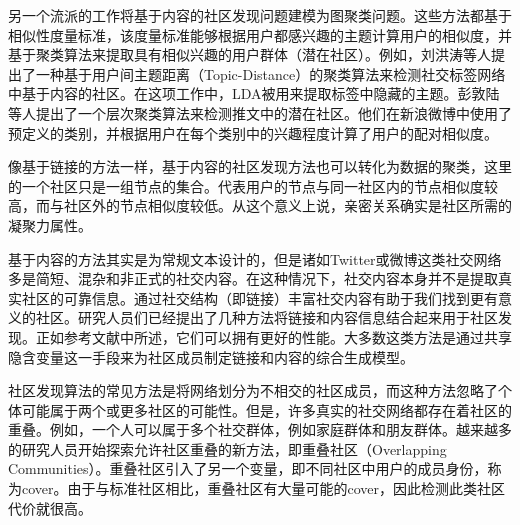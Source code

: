 另一个流派的工作将基于内容的社区发现问题建模为图聚类问题。这些方法都基于相似性度量标准，该度量标准能够根据用户都感兴趣的主题计算用户的相似度，并基于聚类算法来提取具有相似兴趣的用户群体（潜在社区）。例如，刘洪涛等人\cite{Liu2014Community}提出了一种基于用户间主题距离（Topic-Distance）的聚类算法来检测社交标签网络中基于内容的社区。在这项工作中，LDA被用来提取标签中隐藏的主题。彭敦陆等人\cite{Peng2015DICH}提出了一个层次聚类算法来检测推文中的潜在社区。他们在新浪微博中使用了预定义的类别，并根据用户在每个类别中的兴趣程度计算了用户的配对相似度。

像基于链接的方法一样，基于内容的社区发现方法也可以转化为数据的聚类，这里的一个社区只是一组节点的集合。代表用户的节点与同一社区内的节点相似度较高，而与社区外的节点相似度较低。从这个意义上说，亲密关系确实是社区所需的凝聚力属性。


基于内容的方法其实是为常规文本设计的，但是诸如Twitter或微博这类社交网络多是简短、混杂和非正式的社交内容。在这种情况下，社交内容本身并不是提取真实社区的可靠信息\cite{Yang2009Combining}。通过社交结构（即链接）丰富社交内容有助于我们找到更有意义的社区。研究人员们已经提出了几种方法将链接和内容信息结合起来用于社区发现。正如参考文献\cite{Cohn2001The,Getoor2003Learning}中所述，它们可以拥有更好的性能。大多数这类方法是通过共享隐含变量这一手段来为社区成员制定链接和内容的综合生成模型。



社区发现算法的常见方法是将网络划分为不相交的社区成员，而这种方法忽略了个体可能属于两个或更多社区的可能性。但是，许多真实的社交网络都存在着社区的重叠\cite{Xie2013Overlapping}。例如，一个人可以属于多个社交群体，例如家庭群体和朋友群体。越来越多的研究人员开始探索允许社区重叠的新方法，即重叠社区（Overlapping Communities）。重叠社区引入了另一个变量，即不同社区中用户的成员身份，称为cover。由于与标准社区相比，重叠社区有大量可能的cover，因此检测此类社区代价就很高。

